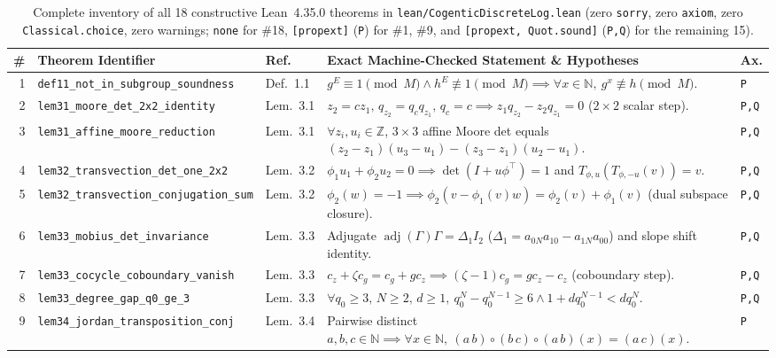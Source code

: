 \documentclass[10pt,twocolumn]{article}
\newcommand{\ZZ}{\mathbb{Z}}
\newcommand{\NN}{\mathbb{N}}
\begin{document}
\begin{table}[t]
\centering
\caption{Complete inventory of all 18 constructive Lean~4.35.0 theorems in \nolinkurl{lean/CogenticDiscreteLog.lean} (zero \texttt{sorry}, zero \texttt{axiom}, zero \texttt{Classical.choice}, zero warnings; \texttt{none} for \#18, \texttt{[propext]} (\texttt{P}) for \#1, \#9, and \texttt{[propext, Quot.sound]} (\texttt{P,Q}) for the remaining 15).}
\label{tab:lean18}
\scriptsize
\setlength{\tabcolsep}{2.6pt}
\begin{tabular}{@{}r l l p{9.7cm} l@{}}
\toprule
\# & Theorem Identifier & Ref.~\cite{cogentic2026dlp} & Exact Machine-Checked Statement \& Hypotheses & Ax. \\
\midrule
1 & \texttt{def11\_not\_in\_subgroup\_soundness} & Def.~1.1 & $g^E \equiv 1 \pmod M \wedge h^E \not\equiv 1 \pmod M \implies \forall x\in\NN,\ g^x \not\equiv h \pmod M$. & \texttt{P} \\
2 & \texttt{lem31\_moore\_det\_2x2\_identity} & Lem.~3.1 & $z_2{=}c z_1,\,q_{z_2}{=}q_c q_{z_1},\,q_c{=}c \implies z_1 q_{z_2} - z_2 q_{z_1} = 0$ ($2{\times}2$ scalar step). & \texttt{P,Q} \\
3 & \texttt{lem31\_affine\_moore\_reduction} & Lem.~3.1 & $\forall z_i,u_i\in\ZZ$, $3{\times}3$ affine Moore det equals $(z_2{-}z_1)(u_3{-}u_1)-(z_3{-}z_1)(u_2{-}u_1)$. & \texttt{P,Q} \\
4 & \texttt{lem32\_transvection\_det\_one\_2x2} & Lem.~3.2 & $\phi_1 u_1{+}\phi_2 u_2{=}0 \implies \det(I{+}u\phi^\top)=1$ and $T_{\phi,u}(T_{\phi,-u}(v))=v$. & \texttt{P,Q} \\
5 & \texttt{lem32\_transvection\_conjugation\_sum} & Lem.~3.2 & $\phi_2(w)=-1 \implies \phi_2(v-\phi_1(v)w)=\phi_2(v)+\phi_1(v)$ (dual subspace closure). & \texttt{P,Q} \\
6 & \texttt{lem33\_mobius\_det\_invariance} & Lem.~3.3 & Adjugate $\operatorname{adj}(\Gamma)\Gamma = \Delta_1 I_2$ ($\Delta_1=a_{0N}a_{10}-a_{1N}a_{00}$) and slope shift identity. & \texttt{P,Q} \\
7 & \texttt{lem33\_cocycle\_coboundary\_vanish} & Lem.~3.3 & $c_z + \zeta c_g = c_g + g c_z \implies (\zeta-1)c_g = g c_z - c_z$ (coboundary step). & \texttt{P,Q} \\
8 & \texttt{lem33\_degree\_gap\_q0\_ge\_3} & Lem.~3.3 & $\forall q_0\ge 3,\,N\ge 2,\,d\ge 1,\ q_0^N - q_0^{N-1}\ge 6 \wedge 1 + d q_0^{N-1} < d q_0^N$. & \texttt{P,Q} \\
9 & \texttt{lem34\_jordan\_transposition\_conj} & Lem.~3.4 & Pairwise distinct $a,b,c\in\NN \implies \forall x\in\NN,\ (a\,b)\circ(b\,c)\circ(a\,b)(x)=(a\,c)(x)$. & \texttt{P} \\

\end{tabular}
\end{table}
\end{document}
